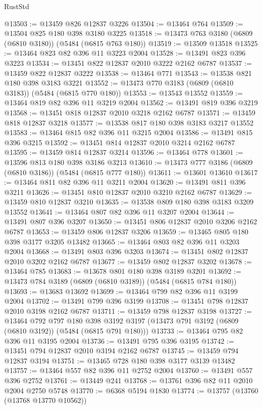 \begin{lexlean}{RustStd}
\begin{coremodule}
{\begin{coremodule}
{{{{{{{{{{{{{{{{{{{{{{{{{{{{{{{@13503 := @13459 @826 @12837 @3226
@13504 := @13464 @764
@13509 := @13504 @825 @180 @398 @3180 @3225
@13518 := @13473 @763 @3180 (@6809 (@6810 @3180)) (@5484 (@6815 @763 @180))
@13519 := @13509 @13518
@13525 := @13464 @823 @82 @396 @11 @3223 @2004
@13528 := @13491 @823 @396 @3223
@13534 := @13451 @822 @12837 @2010 @3222 @2162 @6787
@13537 := @13459 @822 @12837 @3222
@13538 := @13464 @771
@13543 := @13538 @821 @180 @398 @3183 @3221
@13552 := @13473 @770 @3183 (@6809 (@6810 @3183)) (@5484 (@6815 @770 @180))
@13553 := @13543 @13552
@13559 := @13464 @819 @82 @396 @11 @3219 @2004
@13562 := @13491 @819 @396 @3219
@13568 := @13451 @818 @12837 @2010 @3218 @2162 @6787
@13571 := @13459 @818 @12837 @3218
@13577 := @13538 @817 @180 @398 @3183 @3217 @13552
@13583 := @13464 @815 @82 @396 @11 @3215 @2004
@13586 := @13491 @815 @396 @3215
@13592 := @13451 @814 @12837 @2010 @3214 @2162 @6787
@13595 := @13459 @814 @12837 @3214
@13596 := @13464 @778
@13601 := @13596 @813 @180 @398 @3186 @3213
@13610 := @13473 @777 @3186 (@6809 (@6810 @3186)) (@5484 (@6815 @777 @180))
@13611 := @13601 @13610
@13617 := @13464 @811 @82 @396 @11 @3211 @2004
@13620 := @13491 @811 @396 @3211
@13626 := @13451 @810 @12837 @2010 @3210 @2162 @6787
@13629 := @13459 @810 @12837 @3210
@13635 := @13538 @809 @180 @398 @3183 @3209 @13552
@13641 := @13464 @807 @82 @396 @11 @3207 @2004
@13644 := @13491 @807 @396 @3207
@13650 := @13451 @806 @12837 @2010 @3206 @2162 @6787
@13653 := @13459 @806 @12837 @3206
@13659 := @13465 @805 @180 @398 @3177 @3205 @13482
@13665 := @13464 @803 @82 @396 @11 @3203 @2004
@13668 := @13491 @803 @396 @3203
@13674 := @13451 @802 @12837 @2010 @3202 @2162 @6787
@13677 := @13459 @802 @12837 @3202
@13678 := @13464 @785
@13683 := @13678 @801 @180 @398 @3189 @3201
@13692 := @13473 @784 @3189 (@6809 (@6810 @3189)) (@5484 (@6815 @784 @180))
@13693 := @13683 @13692
@13699 := @13464 @799 @82 @396 @11 @3199 @2004
@13702 := @13491 @799 @396 @3199
@13708 := @13451 @798 @12837 @2010 @3198 @2162 @6787
@13711 := @13459 @798 @12837 @3198
@13727 := @13464
    @792
    @797
    @180
    @398
    @3192
    @3197
    (@13473 @791 @3192 (@6809 (@6810 @3192)) (@5484 (@6815 @791 @180)))
@13733 := @13464 @795 @82 @396 @11 @3195 @2004
@13736 := @13491 @795 @396 @3195
@13742 := @13451 @794 @12837 @2010 @3194 @2162 @6787
@13745 := @13459 @794 @12837 @3194
@13751 := @13465 @728 @180 @398 @3177 @3139 @13482
@13757 := @13464 @557 @82 @396 @11 @2752 @2004
@13760 := @13491 @557 @396 @2752
@13761 := @13449 @241
@13768 := @13761 @396 @82 @11 @2010 @2004 @2750 @5748
@13770 := @6368 @5194 @1830
@13774 := @13757 (@13760 (@13768 @13770 @10562))
}}}}}}}}}}}}}}}}}}}}}}}}}}}}}}}
\end{coremodule}}
\end{coremodule}
\end{lexlean}
